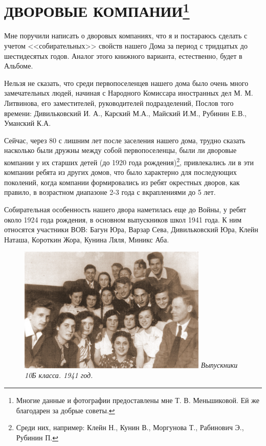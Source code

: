 \chapter{ДВОРОВЫЕ КОМПАНИИ\protect\footnote{Многие данные и фотографии предоставлены мне Т. В. Меньшиковой. Ей же благодарен за добрые советы.}}

\noindent
Мне поручили написать о дворовых компаниях, что я и постараюсь сделать с учетом <<собирательных>> свойств нашего Дома за период с тридцатых до шестидесятых годов. Аналог этого книжного варианта, естественно, будет в Альбоме.

Нельзя не сказать, что среди первопоселенцев нашего дома было очень много замечательных людей, начиная с Народного Комиссара иностранных дел М. М. Литвинова, его заместителей, руководителей подразделений, Послов того времени: Дивильковский И. А., Карский М.А., Майский И.М., Рубинин Е.В., Уманский К.А.

Сейчас, через 80 с лишним лет после заселения нашего дома, трудно сказать насколько были дружны между собой первопоселенцы, были ли дворовые компании у их старших детей (до 1920 года рождения)\footnote{Среди них, например: Клейн Н., Кунин В., Моргунова Т., Рабинович Э., Рубинин П.}, привлекались ли в эти компании ребята из других домов, что было характерно для последующих поколений, когда компании формировались из ребят окрестных дворов, как правило, в возрастном диапазоне 2-3 года с вкраплениями до 5 лет.

Собирательная особенность нашего двора наметилась еще до Войны, у ребят около 1924 года рождения, в основном выпускников школ 1941 года. К ним относятся участники ВОВ: Багун Юра, Варзар Сева, Дивильковский Юра, Клейн Наташа, Короткин Жора, Кунина Ляля, Миникс Аба.

\restoregeometry


\begin{figure}[h]
    \begin{minipage}{90mm}
        \includegraphics[width=90mm]{inc/12/1}
        \textit{\footnotesize{Выпускники 10Б класса. 1941 год.}}
    \end{minipage}
\end{figure}

